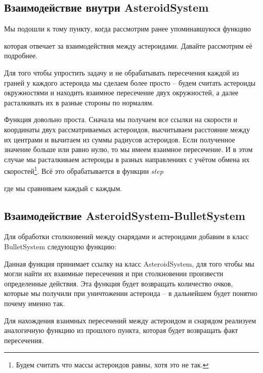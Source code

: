 \subsection{Взаимодействие внутри AsteroidSystem}
Мы подошли к тому пункту, когда рассмотрим ранее упоминавшуюся функцию

которая отвечает за взаимодействия между астероидами. Давайте рассмотрим её подробнее.

Для того чтобы упростить задачу и не обрабатывать пересечения каждой из граней у каждого 
астероида мы сделаем более просто -- будем считать астероиды окружностями и находить 
взаимное пересечение двух окружностей, а далее расталкивать их в разные стороны по 
нормалям.


Функция довольно проста. Сначала мы получаем все ссылки на скорости и координаты 
двух рассматриваемых астероидов, высчитываем расстояние между их центрами и вычитаем 
из суммы радиусов астероидов. Если полученное значение больше или равно нулю, то мы 
имеем взаимное пересечение. И в этом случае мы расталкиваем астероиды в разных 
направлениях с учётом обмена их скоростей\footnote{Будем считать что массы астероидов 
равны, хотя это не так.}. Всё это обрабатывается в функции \emph{step}

где мы сравниваем каждый с каждым.

\newpage

\subsection{Взаимодействие AsteroidSystem-BulletSystem}
\label{ast:collide}
Для обработки столкновений между снарядами и астероидами добавим в класс BulletSystem 
следующую функцию:


Данная функция принимает ссылку на класс AsteroidSystem, для того чтобы мы могли 
найти их взаимные пересечения и при столкновении произвести определенные действия. 
Эта функция будет возвращать количество очков, которые мы получили при уничтожении 
астероида -- в дальнейшем будет понятно почему именно так.

Для нахождения взаимных пересечений между астероидом и снарядом реализуем аналогичную 
функцию из прошлого пункта, которая будет возвращать факт пересечения.


